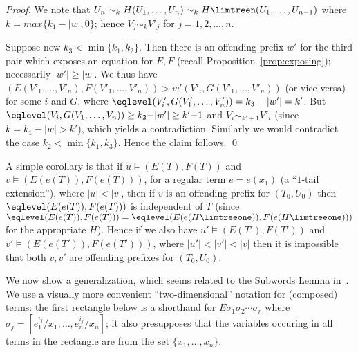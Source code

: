 \documentclass[12pt]{article}
\begin{document}
\begin{proof}
We note that 
$U_n\sim_{k} H(U_1,\dots, U_{n})\sim_{k} 
H\limtreen(U_1,\dots, U_{n-1})$ where $k=max\{k_1{-}|w|,0 \}$;
hence $V_j\sim_{k} V'_j$ for $j=1,2,\dots,n$.

   
Suppose now $k_3<\min\{k_1,k_2\}$. Then 
there is an offending prefix $w'$ for the third pair 
which exposes an equation 
for $E,F$ (recall Proposition~\ref{prop:exposing});
necessarily $|w'|\geq |w|$.
We thus have
$(E(V'_1,\dots,V'_n),F(V'_1,\dots,V'_n))\gt{w'} 
(V'_i,G(V'_1,\dots,V'_n))$ (or vice versa)
for some $i$ and $G$,
where
$\eqlevel(V'_i,G(V'_1,\dots,V'_n))= k_3-|w'|=k'$. 
But
$\eqlevel(V_i,G(V_1,\dots,V_n))\geq
k_2{-}|w'|\geq k'{+}1$ 
and $V_i\sim_{k'+1}V'_i$  (since $k=k_1{-}|w|>k'$), 
which yields a contradiction.
Similarly we would contradict the case $k_2<\min\{k_1,k_3\}$.
Hence the claim follows.
\qed
\end{proof}


\noindent
A simple corollary is that if $u\models (E(T),F(T))$ and 
 $v\models (E(e(T)),F(e(T)))$, for a regular term
 $e=e(x_1)$ (a ``$1$-tail extension''), where $|u|<|v|$, then
 if $v$ is an offending prefix for
 $(T_0,U_0)$
then
$\eqlevel(E(e(T)),F(e(T)))$ is independent of $T$
(since $\eqlevel(E(e(T)),F(e(T)))=\eqlevel(E(e(H\limtreeone)),F(e(H\limtreeone)))$
for the appropriate $H$).
Hence if we also have $u'\models (E(T'),F(T'))$ and
 $v'\models (E(e(T')),F(e(T')))$, where $|u'|<|v'|<|v|$ 
then it is impossible that both $v,v'$ are offending prefixes
for $(T_0,U_0)$.

We now show a generalization, which seems related to
the Subwords Lemma in~\cite{Senizergues:ICALP03}.
We use a visually more convenient ``two-dimensional'' 
notation for (composed) terms: the first rectangle below is a
shorthand for $E\sigma_1\sigma_2\cdots\sigma_r$ 
where $\sigma_j=[e^{i_j}_1/x_1,\dots, e^{i_j}_n/x_n]$; it also
presupposes that the variables occuring in all terms in the rectangle
are from the set $\{x_1,\dots,x_n\}$.
\end{document}
